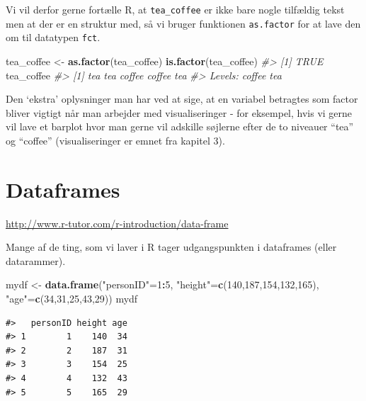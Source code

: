\documentclass[
]{book}
\newenvironment{Shaded}{\begin{snugshade}}{\end{snugshade}}
\newcommand{\CommentTok}[1]{\textcolor[rgb]{0.37,0.37,0.37}{\textit{#1}}}
\newcommand{\DecValTok}[1]{\textcolor[rgb]{0.06,0.06,0.06}{#1}}
\newcommand{\FunctionTok}[1]{\textcolor[rgb]{0.27,0.27,0.27}{\textbf{#1}}}
\newcommand{\NormalTok}[1]{#1}
\newcommand{\OtherTok}[1]{\textcolor[rgb]{0.37,0.37,0.37}{#1}}
\newcommand{\SpecialCharTok}[1]{\textcolor[rgb]{0.43,0.43,0.43}{\textbf{#1}}}
\newcommand{\StringTok}[1]{\textcolor[rgb]{0.5,0.5,0.5}{#1}}
\begin{document}
Vi vil derfor gerne fortælle R, at \texttt{tea\_coffee} er ikke bare nogle tilfældig tekst men at der er en struktur med, så vi bruger funktionen \texttt{as.factor} for at lave den om til datatypen \texttt{fct}.

\begin{Shaded}
\begin{Highlighting}[]
\NormalTok{tea\_coffee }\OtherTok{\textless{}{-}} \FunctionTok{as.factor}\NormalTok{(tea\_coffee)}
\FunctionTok{is.factor}\NormalTok{(tea\_coffee)}
\CommentTok{\#\textgreater{} [1] TRUE}
\NormalTok{tea\_coffee}
\CommentTok{\#\textgreater{} [1] tea    tea    coffee coffee tea   }
\CommentTok{\#\textgreater{} Levels: coffee tea}
\end{Highlighting}
\end{Shaded}

Den `ekstra' oplysninger man har ved at sige, at en variabel betragtes som factor bliver vigtigt når man arbejder med visualiseringer - for eksempel, hvis vi gerne vil lave et barplot hvor man gerne vil adskille søjlerne efter de to niveauer ``tea'' og ``coffee'' (visualiseringer er emnet fra kapitel 3).

\section{Dataframes}\label{dataframes}

\url{http://www.r-tutor.com/r-introduction/data-frame}

Mange af de ting, som vi laver i R tager udgangspunkten i dataframes (eller datarammer).

\begin{Shaded}
\begin{Highlighting}[]
\NormalTok{mydf }\OtherTok{\textless{}{-}} \FunctionTok{data.frame}\NormalTok{(}\StringTok{"personID"}\OtherTok{=}\DecValTok{1}\SpecialCharTok{:}\DecValTok{5}\NormalTok{, }\StringTok{"height"}\OtherTok{=}\FunctionTok{c}\NormalTok{(}\DecValTok{140}\NormalTok{,}\DecValTok{187}\NormalTok{,}\DecValTok{154}\NormalTok{,}\DecValTok{132}\NormalTok{,}\DecValTok{165}\NormalTok{), }\StringTok{"age"}\OtherTok{=}\FunctionTok{c}\NormalTok{(}\DecValTok{34}\NormalTok{,}\DecValTok{31}\NormalTok{,}\DecValTok{25}\NormalTok{,}\DecValTok{43}\NormalTok{,}\DecValTok{29}\NormalTok{))}
\NormalTok{mydf}
\end{Highlighting}
\end{Shaded}

\begin{verbatim}
#>   personID height age
#> 1        1    140  34
#> 2        2    187  31
#> 3        3    154  25
#> 4        4    132  43
#> 5        5    165  29
\end{verbatim}
\end{document}
